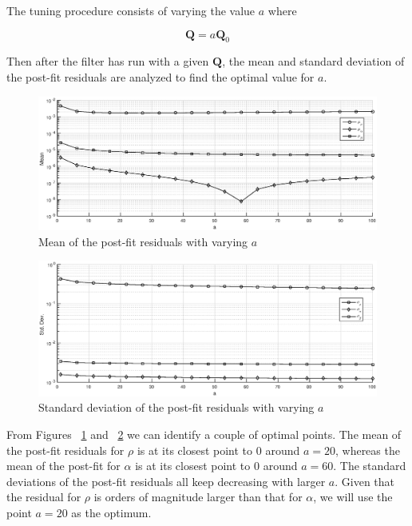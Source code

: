 \documentclass{article}
\begin{document}
The tuning procedure consists of varying the value $a$ where

\begin{equation}\label{eqn:Q}
	\mathbf{Q} = a\mathbf{Q}_0
\end{equation}

Then after the filter has run with a given $\mathbf{Q}$, the mean and standard deviation of the post-fit residuals are analyzed to find the optimal value for $a$.

\begin{figure}[!htbp]
	\centering
	\includegraphics[scale=0.5]{figs/tuning_mean.eps}
	\caption{Mean of the post-fit residuals with varying $a$}
	\label{fig:tuning_mean}
\end{figure}

\begin{figure}[!htbp]
	\centering
	\includegraphics[scale=0.5]{figs/tuning_stddev.eps}
	\caption{Standard deviation of the post-fit residuals with varying $a$}
	\label{fig:tuning_stddev}
\end{figure}

From Figures ~\ref{fig:tuning_mean} and ~\ref{fig:tuning_stddev} we can identify a couple of optimal points. The mean of the post-fit residuals for $\rho$ is at its closest point to 0 around $a=20$, whereas the mean of the post-fit for $\alpha$ is at its closest point to 0 around $a=60$. The standard deviations of the post-fit residuals all keep decreasing with larger $a$. Given that the residual for $\rho$ is orders of magnitude larger than that for $\alpha$, we will use the point $a=20$ as the optimum.
\end{document}
